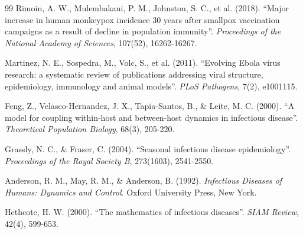 ﻿\documentclass[a4paper,12pt]{article}
\theoremstyle{definition}
\begin{document}
\begin{thebibliography}{99}
Rimoin, A. W., Mulembakani, P. M., Johnston, S. C., et al. (2018).
``Major increase in human monkeypox incidence 30 years after smallpox vaccination campaigns as a result of decline in population immunity''.
\textit{Proceedings of the National Academy of Sciences}, 107(52), 16262-16267.

Martinez, N. E., Sospedra, M., Volc, S., et al. (2011).
``Evolving Ebola virus research: a systematic review of publications addressing viral structure, epidemiology, immunology and animal models''.
\textit{PLoS Pathogens}, 7(2), e1001115.

Feng, Z., Velasco-Hernandez, J. X., Tapia-Santos, B., \& Leite, M. C. (2000).
``A model for coupling within-host and between-host dynamics in infectious disease''.
\textit{Theoretical Population Biology}, 68(3), 205-220.

Grassly, N. C., \& Fraser, C. (2004).
``Seasonal infectious disease epidemiology''.
\textit{Proceedings of the Royal Society B}, 273(1603), 2541-2550.

Anderson, R. M., May, R. M., \& Anderson, B. (1992).
\textit{Infectious Diseases of Humans: Dynamics and Control}.
Oxford University Press, New York.

Hethcote, H. W. (2000).
``The mathematics of infectious diseases''.
\textit{SIAM Review}, 42(4), 599-653.

\end{thebibliography}
\end{document}
